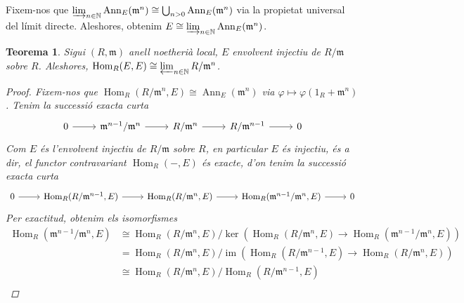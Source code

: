 \documentclass[compress]{article}
\newtheorem{teorema}{Teorema}
\theoremstyle{definition}
\DeclareMathOperator{\im}{im}
\DeclareMathOperator{\Hom}{Hom}
\DeclareMathOperator{\Ann}{Ann}
\begin{document}
Fixem-nos que $\varinjlim_{n\in\mathbb{N}}\Ann_{E}(\mathfrak{m}^{n})\cong\bigcup_{n>0}\Ann_{E}(\mathfrak{m}^{n})$ via la propietat universal del límit directe. Aleshores, obtenim $E\cong\varinjlim_{n\in\mathbb{N}}\Ann_{E}(\mathfrak{m}^{n})$.
\begin{teorema}
    Sigui $(R,\mathfrak{m})$ anell noetherià local, $E$ envolvent injectiu de $R/\mathfrak{m}$ sobre $R$. Aleshores, $\Hom_{R}(E,E)\newline\cong\varprojlim_{n\in\mathbb{N}} R/\mathfrak{m}^{n}$.
    \begin{proof}
        Fixem-nos que $\Hom_{R}(R/\mathfrak{m}^{n},E)\cong\Ann_{E}(\mathfrak{m}^{n})$ via $\varphi\mapsto\varphi(1_{R}+\mathfrak{m}^{n})$. Tenim la successió exacta curta
        \begin{equation*}
        \begin{tikzcd}
            0
            \arrow{r}
            &\mathfrak{m}^{n-1}/\mathfrak{m}^{n}
            \arrow{r}
            &R/\mathfrak{m}^{n}
            \arrow{r}
            &R/\mathfrak{m}^{n-1}
            \arrow{r}
            &0
        \end{tikzcd}
        \end{equation*}
        Com $E$ és l'envolvent injectiu de $R/\mathfrak{m}$ sobre $R$, en particular $E$ és injectiu, és a dir, el functor contravariant $\Hom_{R}(-,E)$ és exacte, d'on tenim la successió exacta curta
        \begin{equation*}
        \begin{tikzcd}
            0
            \arrow{r}
            &\Hom_{R}(R/\mathfrak{m}^{n-1},E)
            \arrow{r}
            &\Hom_{R}(R/\mathfrak{m}^{n},E)
            \arrow{r}
            &\Hom_{R}(\mathfrak{m}^{n-1}/\mathfrak{m}^{n},E)
            \arrow{r}
            &0
        \end{tikzcd}
        \end{equation*}
        Per exactitud, obtenim els isomorfismes
        \begin{align*}
            \Hom_{R}(\mathfrak{m}^{n-1}/\mathfrak{m}^{n},E)
            &\cong\Hom_{R}(R/\mathfrak{m}^{n},E)/\ker(\Hom_{R}(R/\mathfrak{m}^{n},E)\rightarrow\Hom_{R}(\mathfrak{m}^{n-1}/\mathfrak{m}^{n},E))\\
            &=\Hom_{R}(R/\mathfrak{m}^{n},E)/\im(\Hom_{R}(R/\mathfrak{m}^{n-1},E)\rightarrow\Hom_{R}(R/\mathfrak{m}^{n},E))\\
            &\cong\Hom_{R}(R/\mathfrak{m}^{n},E)/\Hom_{R}(R/\mathfrak{m}^{n-1},E)\\

\end{align*}
\end{proof}
\end{teorema}
\end{document}
